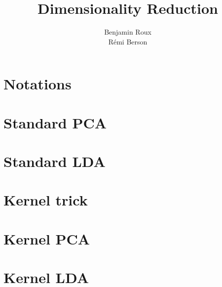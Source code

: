 \documentclass[a4paper]{article}
\title{Dimensionality Reduction}
\author{Benjamin Roux \\ Rémi Berson}
\date{}
\begin{document}
\maketitle

\section*{Notations}


\section*{Standard PCA}


\section*{Standard LDA}


\section*{Kernel trick}


\section*{Kernel PCA}


\section*{Kernel LDA}

\end{document}
